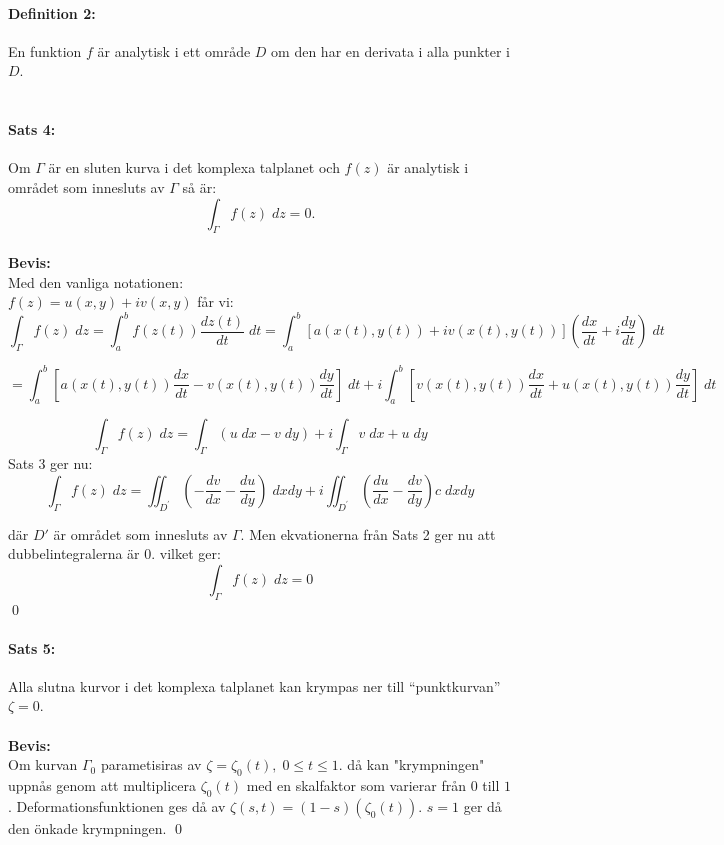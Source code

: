 \documentclass{article}%
\begin{document}
\paragraph{Definition 2:} En funktion $f$ är analytisk i ett område $D$ om den har en derivata i alla punkter i $D$.\\
\\
\paragraph{Sats 4:} Om $\Gamma$ är en sluten kurva i det komplexa talplanet och $f(z)$ är analytisk i området som innesluts av $\Gamma$ så är:
$$\int_{\Gamma} f(z) \; dz = 0.$$
\\
{\bf Bevis:}\\
Med den vanliga notationen:\\
$f(z) = u(x, y) + iv(x, y)$ får vi:
$$\int_{\Gamma} f(z) \; dz = \int_a^b f(z(t)) \frac {dz(t)} {dt} \; dt = \int_a^b [a(x(t), y(t)) + iv(x(t), y(t)) ]
\left ( \frac {dx} {dt} + i \frac {dy} {dt} \right ) \; dt$$

$$= \int_a^b \left [a(x(t), y(t)) \frac {dx} {dt} - v(x(t), y(t)) \frac {dy} {dt} \right ] \; dt + i \int_a^b \left [v(x(t), y(t)) \frac {dx} {dt} + 
u(x(t), y (t)) \frac {dy} {dt} \right ] \; dt$$

$$\int_{\Gamma} f(z) \; dz = \int_\Gamma (u \; dx - v \; dy) + i \int_\Gamma v \; dx + u \; dy$$
Sats 3 ger nu:
$$\int_{\Gamma} f(z) \; dz = \iint_{D^\prime} \left ( - \frac {dv} {dx} - \frac {du} {dy} \right ) \; dxdy +
i \iint_{D^\prime} \left ( \frac {du} {dx} - \frac {dv} {dy} \right )c \; dxdy$$

där $D'$ är området som innesluts av $\Gamma$. Men ekvationerna från Sats 2 ger nu att
dubbelintegralerna är $0$. vilket ger:
$$\int_\Gamma f(z) \; dz = 0$$
\hfill \qed

\paragraph{Sats 5:} Alla slutna kurvor i det komplexa talplanet kan krympas ner till ``punktkurvan'' $\zeta = 0$.\\
\\
{\bf Bevis:}\\
Om kurvan $\Gamma_0$ parametisiras av $\zeta = \zeta_0(t), \; 0 \le t \le 1.$
då kan "krympningen" uppnås genom att multiplicera $\zeta_0(t)$ med en skalfaktor som varierar från $0$ till $1$. 
Deformationsfunktionen ges då av $\zeta(s, t) = (1-s)(\zeta_0(t)).$ $s = 1$ ger då den önkade krympningen.
\hfill \qed
\end{document}
